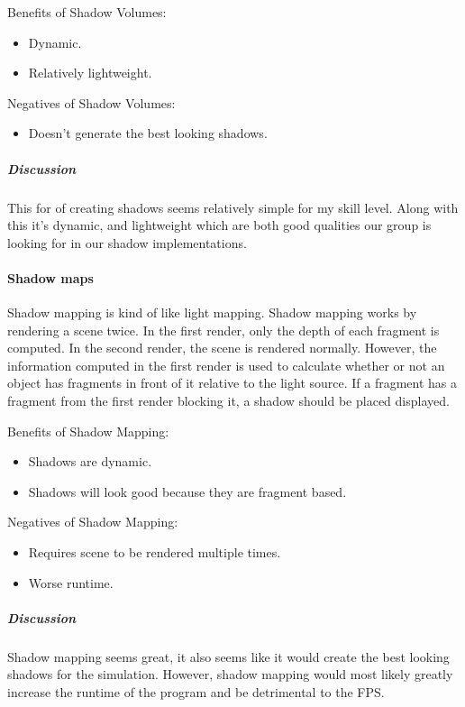 Benefits of Shadow Volumes:
\begin{itemize}
\item Dynamic.
\item Relatively lightweight.
\end{itemize}

Negatives of Shadow Volumes:
\begin{itemize}
\item Doesn't generate the best looking shadows.
\end{itemize}

\subparagraph{Discussion}
\vspace{3mm}
This for of creating shadows seems relatively simple for my skill level.
Along with this it's dynamic, and lightweight which are both good qualities our group is looking for in our shadow implementations.

\paragraph{Shadow maps}
Shadow mapping is kind of like light mapping.
Shadow mapping works by rendering a scene twice.
In the first render, only the depth of each fragment is computed.
In the second render, the scene is rendered normally.
However, the information computed in the first render is used to calculate whether or not an object has fragments in front of it relative to the light source.
If a fragment has a fragment from the first render blocking it, a shadow should be placed displayed. \cite{shadowMapping}

Benefits of Shadow Mapping:
\begin{itemize}
\item Shadows are dynamic.
\item Shadows will look good because they are fragment based.
\end{itemize}

Negatives of Shadow Mapping:
\begin{itemize}
\item Requires scene to be rendered multiple times.
\item Worse runtime.
\end{itemize}

\subparagraph{Discussion}
\vspace{3mm}
Shadow mapping seems great, it also seems like it would create the best looking shadows for the simulation.
However, shadow mapping would most likely greatly increase the runtime of the program and be detrimental to the FPS.


